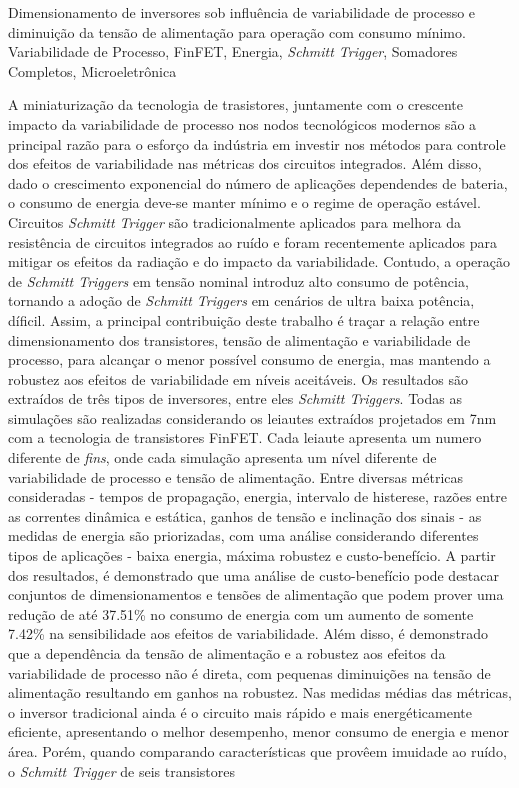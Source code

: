\documentclass[diss,pgmicro,english]{iiufrgs}
\begin{document}

\begin{englishabstract}
{
Dimensionamento de inversores sob influência de variabilidade de processo e diminuição da  tensão de alimentação para operação com consumo mínimo.
}{Variabilidade de Processo, FinFET, Energia, \textit{Schmitt Trigger}, Somadores Completos, Microeletrônica}
{

A miniaturização da tecnologia de trasistores, juntamente com o crescente impacto da variabilidade de processo nos nodos tecnológicos modernos são a principal razão para o esforço da indústria em investir nos métodos para controle dos efeitos de variabilidade nas métricas dos circuitos integrados. Além disso, dado o crescimento exponencial do número de aplicações dependendes de bateria, o consumo de energia deve-se manter mínimo e o regime de operação estável. Circuitos \textit{Schmitt Trigger} são tradicionalmente aplicados para melhora da resistência de circuitos integrados ao ruído e foram recentemente aplicados para mitigar os efeitos da radiação e do impacto da variabilidade. Contudo, a operação de \textit{Schmitt Triggers} em tensão nominal introduz alto consumo de potência, tornando a adoção de \textit{Schmitt Triggers} em cenários de ultra baixa potência, díficil. Assim, a principal contribuição deste trabalho é traçar a relação entre dimensionamento dos transistores, tensão de alimentação e variabilidade de processo, para alcançar o menor possível consumo de energia, mas mantendo a robustez aos efeitos de variabilidade em níveis aceitáveis. Os resultados são extraídos de três tipos de inversores, entre eles \textit{Schmitt Triggers}. Todas as simulações são realizadas considerando os leiautes extraídos projetados em 7nm com a tecnologia de transistores FinFET. Cada leiaute apresenta um numero diferente de \textit{fins}, onde cada simulação apresenta um nível diferente de variabilidade de processo e tensão de alimentação. Entre diversas métricas consideradas - tempos de propagação, energia, intervalo de histerese, razões entre as correntes dinâmica e estática, ganhos de tensão e inclinação dos sinais - as medidas de energia são priorizadas, com uma análise considerando diferentes tipos de aplicações - baixa energia, máxima robustez e custo-benefício. A partir dos resultados, é demonstrado que uma análise de custo-benefício pode destacar conjuntos de dimensionamentos e tensões de alimentação que podem prover uma redução de até 37.51\% no consumo de energia com um aumento de somente 7.42\% na sensibilidade aos efeitos de variabilidade. Além disso, é demonstrado que a dependência da tensão de alimentação e a robustez aos efeitos da variabilidade de processo não é direta, com pequenas diminuições na tensão de alimentação resultando em ganhos na robustez. Nas medidas médias das métricas, o inversor tradicional ainda é o circuito mais rápido e mais energéticamente eficiente, apresentando o melhor desempenho,  menor consumo de energia e menor área. Porém, quando comparando características que provêem imuidade ao ruído, o \textit{Schmitt Trigger} de seis transistores }
\end{englishabstract}
\end{document}
